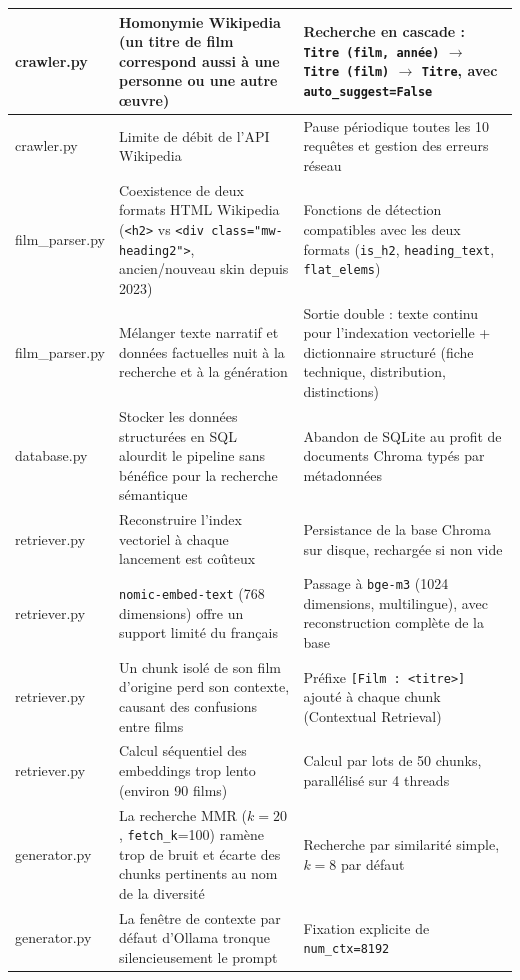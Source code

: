 \documentclass[11pt]{report}
\begin{document}
\begin{xltabular}{\textwidth}{|l|X|X|}
        crawler.py & Homonymie Wikipedia (un titre de film correspond aussi à une personne ou une autre œuvre) & Recherche en cascade : \texttt{Titre (film, année)} $\rightarrow$ \texttt{Titre (film)} $\rightarrow$ \texttt{Titre}, avec \texttt{auto\_suggest=False} \\
        \hline
        crawler.py & Limite de débit de l'API Wikipedia & Pause périodique toutes les 10 requêtes et gestion des erreurs réseau \\
        \hline
        film\_parser.py & Coexistence de deux formats HTML Wikipedia (\texttt{<h2>} vs \texttt{<div class="mw-heading2">}, ancien/nouveau skin depuis 2023) & Fonctions de détection compatibles avec les deux formats (\texttt{is\_h2}, \texttt{heading\_text}, \texttt{flat\_elems}) \\
        \hline
        film\_parser.py & Mélanger texte narratif et données factuelles nuit à la recherche et à la génération & Sortie double : texte continu pour l'indexation vectorielle + dictionnaire structuré (fiche technique, distribution, distinctions) \\
        \hline
        database.py & Stocker les données structurées en SQL alourdit le pipeline sans bénéfice pour la recherche sémantique & Abandon de SQLite au profit de documents Chroma typés par métadonnées \\
        \hline
        retriever.py & Reconstruire l'index vectoriel à chaque lancement est coûteux & Persistance de la base Chroma sur disque, rechargée si non vide \\
        \hline
        retriever.py & \texttt{nomic-embed-text} (768 dimensions) offre un support limité du français & Passage à \texttt{bge-m3} (1024 dimensions, multilingue), avec reconstruction complète de la base \\
        \hline
        retriever.py & Un chunk isolé de son film d'origine perd son contexte, causant des confusions entre films & Préfixe \texttt{[Film : <titre>]} ajouté à chaque chunk (Contextual Retrieval) \\
        \hline
        retriever.py & Calcul séquentiel des embeddings trop lento (environ 90 films) & Calcul par lots de 50 chunks, parallélisé sur 4 threads \\
        \hline
        generator.py & La recherche MMR ($k=20$, \texttt{fetch\_k}=100) ramène trop de bruit et écarte des chunks pertinents au nom de la diversité & Recherche par similarité simple, $k=8$ par défaut \\
        \hline
        generator.py & La fenêtre de contexte par défaut d'Ollama tronque silencieusement le prompt & Fixation explicite de \texttt{num\_ctx=8192} \\

\end{xltabular}
\end{document}
